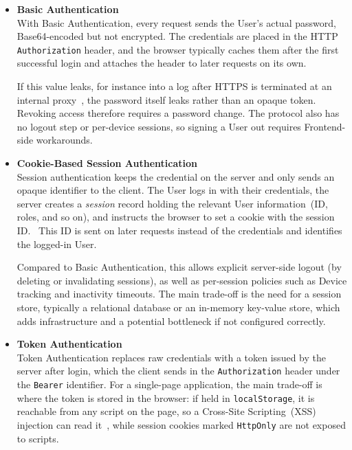 \begin{itemize}
    \item \textbf{Basic Authentication} \\
    With Basic Authentication, every request sends the User's actual
    password, Base64-encoded but not encrypted.
    The credentials are placed in the HTTP \texttt{Authorization} header, and the
    browser typically caches them after the first successful login and attaches
    the header to later requests on its own.~\parencite{basic_auth}

    If this value leaks, for instance into a log after HTTPS
    is terminated at an internal proxy~\parencite{azure_tls_termination},
    the password itself leaks rather than an opaque token.
    Revoking access therefore requires a password change.
    The protocol also has no logout step or per-device sessions, so signing a
    User out requires Frontend-side workarounds.

    \item \textbf{Cookie-Based Session Authentication} \\
    Session authentication keeps the credential on the server and only sends an
    opaque identifier to the client.
    The User logs in with their credentials, the server creates a \textit{session}
    record holding the relevant User information~(ID, roles, and so on), and
    instructs the browser to set a cookie with the session
    ID\@.~\parencite{session_auth}
    This ID is sent on later requests instead of the credentials and
    identifies the logged-in User.

    Compared to Basic Authentication, this allows explicit server-side logout
    (by deleting or invalidating sessions), as well as per-session
    policies such as Device tracking and inactivity timeouts.
    The main trade-off is the need for a session store, typically a relational
    database or an in-memory key-value store, which adds infrastructure and a
    potential bottleneck if not configured correctly.

    \item \textbf{Token Authentication} \\
    Token Authentication replaces raw credentials with a token issued by the
    server after login, which the client sends in the \texttt{Authorization}
    header under the \texttt{Bearer} identifier.
    For a single-page application, the main trade-off is where
    the token is stored in the browser: if held in \texttt{localStorage}, it is
    reachable from any script on the page, so a Cross-Site Scripting~(XSS)
    injection can read it~\parencite{owasp_xss}, while session cookies marked \texttt{HttpOnly} are
    not exposed to scripts.~\parencite{mdn_httponly}


\end{itemize}
